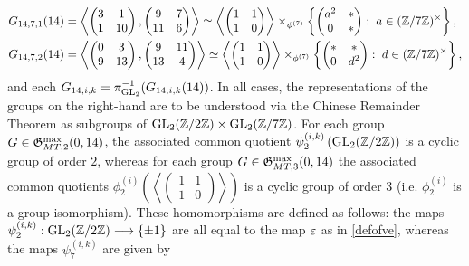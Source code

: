 \begin{equation}
\begin{split}
G_{14,7,1}(14) &= \left\langle \begin{pmatrix} 3 & 1 \\ 1 & 10 \end{pmatrix}, \begin{pmatrix} 9 & 7 \\ 11 & 6 \end{pmatrix} \right\rangle \simeq \left\langle \begin{pmatrix} 1 & 1 \\ 1 & 0 \end{pmatrix} \right\rangle \times_{\phi^{(7)}} \left\{ \begin{pmatrix} a^2 & * \\ 0 & * \end{pmatrix} : \; a \in (\mathbb{Z}/7\mathbb{Z})^\times \right\}, \\
G_{14,7,2}(14) &= \left\langle \begin{pmatrix} 0 & 3 \\ 9 & 13 \end{pmatrix}, \begin{pmatrix} 9 & 11 \\ 13 & 4 \end{pmatrix} \right\rangle \simeq \left\langle \begin{pmatrix} 1 & 1 \\ 1 & 0 \end{pmatrix} \right\rangle \times_{\phi^{(7)}} \left\{ \begin{pmatrix} * & * \\ 0 & d^2 \end{pmatrix} : \; d \in (\mathbb{Z}/7\mathbb{Z})^\times \right\},
\end{split}
\end{equation}
and each $G_{14,i,k} = \pi_{\operatorname{GL}_2}^{-1}(G_{14,i,k}(14))$. In all cases, the representations of the groups on the right-hand are to be understood via the Chinese Remainder Theorem as subgroups of $\operatorname{GL}_2(\mathbb{Z}/2\mathbb{Z}) \times \operatorname{GL}_2(\mathbb{Z}/7\mathbb{Z})$.
For each group $G \in \mathfrak{G}_{MT,2}^{\max}(0,14)$, the associated common quotient $\psi_2^{(i,k)}\left( \operatorname{GL}_2(\mathbb{Z}/2\mathbb{Z}) \right)$ is a cyclic group of order $2$, whereas for each group $G \in \mathfrak{G}_{MT,3}^{\max}(0,14)$ the associated common quotients $\phi_2^{(i)}\left( \left\langle \begin{pmatrix} 1 & 1 \\ 1 & 0 \end{pmatrix} \right\rangle \right)$ is a cyclic group of order $3$ (i.e. $\phi_2^{(i)}$ is a group isomorphism). These homomorphisms are defined as follows: the maps $\psi_2^{(i,k)} : \operatorname{GL}_2(\mathbb{Z}/2\mathbb{Z}) \longrightarrow \{ \pm 1 \}$ are all equal to the map $\varepsilon$ as in \eqref{defofve}, whereas the maps $\psi_7^{(i,k)}$ are given by
